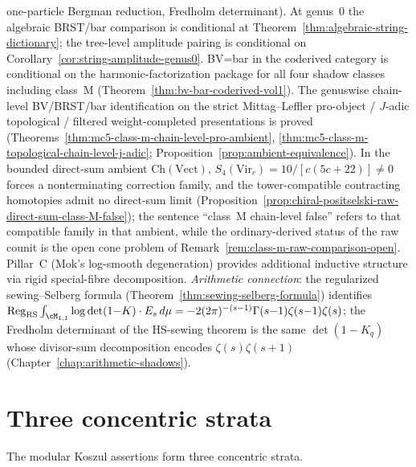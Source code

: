 \begin{remark}
\begin{itemize}
 one-particle Bergman reduction, Fredholm determinant). At genus~$0$
 the algebraic BRST/bar comparison is conditional at
 Theorem~\ref{thm:algebraic-string-dictionary}; the tree-level
 amplitude pairing is conditional on
 Corollary~\ref{cor:string-amplitude-genus0}.
 BV=bar in the coderived category is conditional on the
 harmonic-factorization package for all four shadow classes including
 class~M (Theorem~\ref{thm:bv-bar-coderived-vol1}).
 The genuswise chain-level BV/BRST/bar identification on the strict
 Mittag--Leffler pro-object / $J$-adic topological / filtered
 weight-completed presentations is proved
 \textup{(}Theorems~\ref{thm:mc5-class-m-chain-level-pro-ambient},
 \ref{thm:mc5-class-m-topological-chain-level-j-adic};
 Proposition~\ref{prop:ambient-equivalence}\textup{)}. In the bounded
 direct-sum ambient $\mathrm{Ch}(\mathrm{Vect})$,
 $S_4(\mathrm{Vir}_c)=10/[c(5c+22)]\neq 0$ forces a nonterminating
 correction family, and the tower-compatible contracting homotopies
 admit no direct-sum limit
 (Proposition~\ref{prop:chiral-positselski-raw-direct-sum-class-M-false});
 the sentence ``class~M chain-level false'' refers to that compatible
 family in that ambient, while the ordinary-derived status of the raw
 counit is the open cone problem of
 Remark~\ref{rem:class-m-raw-comparison-open}.
 Pillar~C (Mok's log-smooth degeneration) provides additional
 inductive structure via rigid special-fibre decomposition.
 \emph{Arithmetic connection}: the regularized sewing--Selberg formula
 (Theorem~\ref{thm:sewing-selberg-formula}) identifies
 $\operatorname*{Reg}_{\mathrm{RS}}
 \int_{\cM_{1,1}}\log\det(1{-}K)\cdot E_s\,d\mu
 = -2(2\pi)^{-(s-1)}\Gamma(s{-}1)\zeta(s{-}1)\zeta(s)$;
 the Fredholm determinant of the HS-sewing theorem is the
 same $\det(1{-}K_q)$ whose divisor-sum decomposition
 encodes $\zeta(s)\zeta(s{+}1)$
 (Chapter~\ref{chap:arithmetic-shadows}).
\end{itemize}
\end{remark}

\section{Three concentric strata}
\label{sec:three-rings}

The modular Koszul assertions form three concentric strata.

